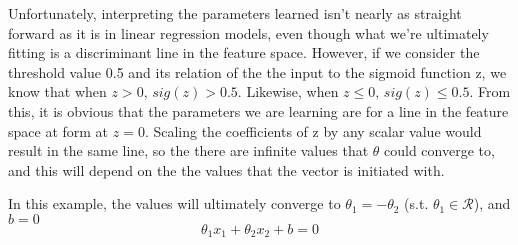 \documentclass[11pt,largemargins]{homework}
\begin{document}
Unfortunately, interpreting the parameters learned isn't nearly as straight forward as it is in linear regression models, even though what we're ultimately fitting is a discriminant line in the feature space. However, if we consider the threshold value 0.5 and its relation of the the input to the sigmoid function z, we know that when $z > 0,\,sig(z) > 0.5$. Likewise, when $z\leq 0, \, sig(z) \leq 0.5$. From this, it is obvious that the parameters we are learning are for a line in the feature space at form at $z=0$. Scaling the coefficients of z by any scalar value would result in the same line, so the there are infinite values that $\theta$ could converge to, and this will depend on the the values that the vector is initiated with.


In this example, the values will ultimately converge to $\theta_1=-\theta_2$ (s.t. $\theta_1\in\mathcal{R}$), and $b=0$
$$\theta_1x_1+\theta_2x_2+b=0$$
\end{document}
